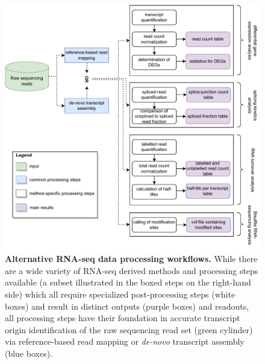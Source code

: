 \begin{figure}
	 \centering
	 \includegraphics[width=1\linewidth]{img/chapter1/rna_seq_processing-block_diagram}
	  \caption[Alternative RNA-seq data processing workflows]{\textbf{Alternative RNA-seq data processing workflows.} While there are a wide variety of RNA-seq derived methods and processing steps available (a subset illustrated in the boxed steps on the right-hand side) which all require specialized post-processing steps (white boxes) and result in distinct outputs (purple boxes) and readouts, all processing steps have their foundation in accurate transcript origin identification of the raw sequencing read set (green cylinder) via reference-based read mapping or \textit{de-novo} transcript assembly (blue boxes).}
	 \label{fig:rna_seq_processing}
\end{figure}

